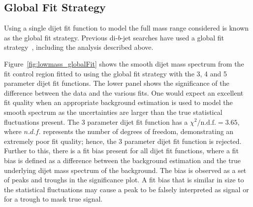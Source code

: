


\subsection{Global Fit Strategy}
\label{sec:bkg-full_globalFit}

Using a single dijet fit function to model the full mass range considered is known as the global fit strategy.
Previous di-$b$-jet searches have used a global fit strategy~\cite{dibjet-mori16_paper}, including the \summer{} analysis described above.


Figure~\ref{fig:lowmass_globalFit} shows the smooth dijet mass spectrum from the fit control region
fitted to using the global fit strategy with the 3, 4 and 5 parameter dijet fit functions.
The lower panel shows the significance of the difference between the data and the various fits.
One would expect an excellent fit quality when an appropriate background estimation is used
to model the smooth spectrum as the uncertainties are larger than the true statistical fluctuations present.
The 3 parameter dijet fit function has a $\chi^{2}/\text{n.d.f.} = 3.65$,
where $n.d.f.$ represents the number of degrees of freedom, demonstrating an extremely poor fit quality;
hence, the 3 parameter dijet fit function is rejected.
Further to this, there is a fit bias present for all dijet fit functions,
where a fit bias is defined as a difference between the background estimation and the true underlying dijet mass spectrum of the background.
The bias is observed as a set of peaks and troughs in the significance plot.
A fit bias that is similar in size to the statistical fluctuations
may cause a peak to be falsely interpreted as signal or for a trough to mask true signal.

